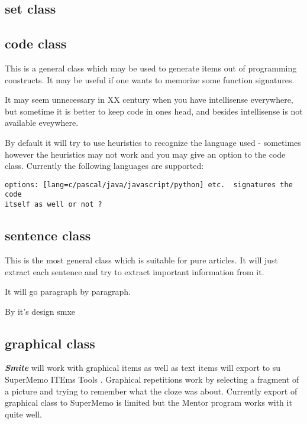 \documentclass[a4paper,11pt]{article}
\newcommand{\smite}{\emph{\textbf{Smite{}}}}
\begin{document}
\subsection{set class}


\subsection{code class}

This is a general class which may be used to generate items out of programming
constructs. It may be useful if one wants to memorize some function signatures.

It may seem unnecessary in XX century when you have intellisense everywhere,
but sometime it is better to keep code in ones head, and besides intellisense
is not available eveywhere.

By default it will try to use heuristics to recognize the language used -
sometimes however the heuristics may not work and you may give an option to the
code class.  Currently the following languages are supported:

\begin{verbatim}
options: [lang=c/pascal/java/javascript/python] etc.  signatures the code
itself as well or not ?
\end{verbatim}



\subsection{sentence class}

This is the most general class which is suitable for pure articles.  It will
just extract each sentence and try to extract important information from it.

It will go paragraph by paragraph.

By it's design smxe






\subsection{graphical class}

\smite{} will work with graphical items as well as text items will export to su
SuperMemo ITEms Tools .  Graphical repetitions work by selecting a fragment of
a picture and trying to remember what the cloze was about.  Currently export of
graphical class to SuperMemo is limited but the Mentor program works with it
quite well.
\end{document}

